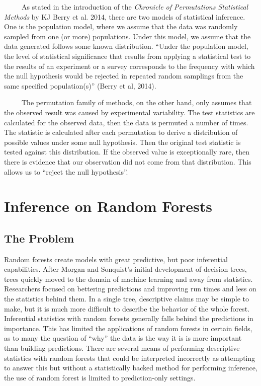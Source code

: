 \documentclass[12pt,twoside]{reedthesis}
\begin{document}
  ~~~~~As stated in the introduction of the \emph{Chronicle of
  Permutations Statistical Methods} by KJ Berry et al. 2014, there are two
  models of statistical inference. One is the population model, where we
  assume that the data was randomly sampled from one (or more)
  populations. Under this model, we assume that the data generated follows
  some known distribution. ``Under the population model, the level of
  statistical significance that results from applying a statistical test
  to the results of an experiment or a survey corresponds to the frequency
  with which the null hypothesis would be rejected in repeated random
  samplings from the same specified population(s)'' (Berry et al, 2014).
  
  ~~~~~The permutation family of methods, on the other hand, only assumes
  that the observed result was caused by experimental variability. The
  test statistics are calculated for the observed data, then the data is
  permuted a number of times. The statistic is calculated after each
  permutation to derive a distribution of possible values under some null
  hypothesis. Then the original test statistic is tested against this
  distribution. If the observed value is exceptionally rare, then there is
  evidence that our observation did not come from that distribution. This
  allows us to ``reject the null hypothesis''.
  
  \section{Inference on Random Forests}\label{inference-on-random-forests}
  
  \subsection{The Problem}\label{the-problem}
  
  Random forests create models with great predictive, but poor inferential
  capabilities. After Morgan and Sonquist's initial development of
  decision trees, trees quickly moved to the domain of machine learning
  and away from statistics. Researchers focused on bettering predictions
  and improving run times and less on the statistics behind them. In a
  single tree, descriptive claims may be simple to make, but it is much
  more difficult to describe the behavior of the whole forest. Inferential
  statistics with random forests generally falls behind the predictions in
  importance. This has limited the applications of random forests in
  certain fields, as to many the question of ``why'' the data is the way
  it is is more important than building predictions. There are several
  means of performing descriptive statistics with random forests that
  could be interpreted incorrectly as attempting to answer this but
  without a statistically backed method for performing inference, the use
  of random forest is limited to prediction-only settings.
  
\end{document}
